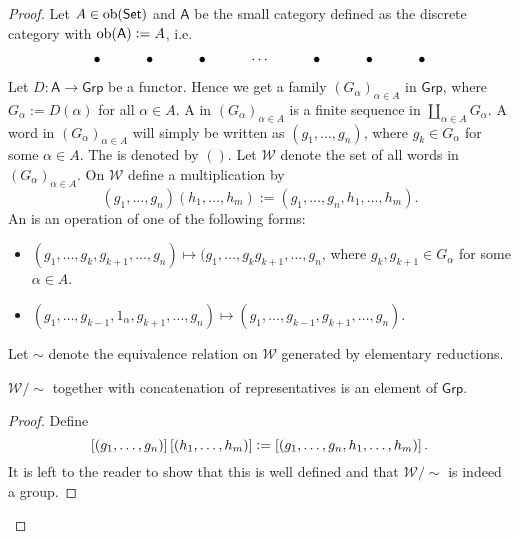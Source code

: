 \begin{proof}
	Let $A \in \operatorname{ob}(\mathsf{Set})$ and $\mathsf{A}$ be the small category defined as the discrete category with $\operatorname{ob}(\mathsf{A}) := A$, i.e.
	\begin{equation*}
		\begin{tikzcd}
			\bullet & \bullet & \bullet & \cdots & \bullet & \bullet & \bullet
		\end{tikzcd}
	\end{equation*}	
	Let $D : \mathsf{A} \to \mathsf{Grp}$ be a functor. Hence we get a family $(G_\alpha)_{\alpha \in A}$ in $\mathsf{Grp}$, where $G_\alpha := D(\alpha)$ for all $\alpha \in A$. A  in $(G_\alpha)_{\alpha \in A}$ is a finite sequence in $\coprod_{\alpha \in A}G_\alpha$. A word in $(G_\alpha)_{\alpha \in A}$ will simply be written as $(g_1,\dots, g_n)$, where $g_k \in G_\alpha$ for some $\alpha \in A$. The  is denoted by $()$. Let $\mathcal{W}$ denote the set of all words in $(G_\alpha)_{\alpha \in A}$. On $\mathcal{W}$ define a multiplication by 
	\begin{equation*}
		(g_1,\dots, g_n)(h_1,\dots, h_m) := (g_1, \dots, g_n,h_1, \dots, h_m).
	\end{equation*}
	An  is an operation of one of the following forms:
	\begin{itemize}[leftmargin = *]
		\item $(g_1, \dots ,g_k,g_{k + 1}, \dots, g_n) \mapsto (g_1,\dots,g_kg_{k + 1},\dots,g_n $, where $g_k,g_{k + 1} \in G_\alpha$ for some $\alpha \in A$.
		\item $(g_1,\dots,g_{k - 1},1_\alpha,g_{k + 1},\dots,g_n) \mapsto (g_1,\dots,g_{k - 1},g_{k + 1},\dots,g_n)$.
	\end{itemize}
	Let $\sim$ denote the equivalence relation on $\mathcal{W}$ generated by elementary reductions. 
	
	\begin{lemma}
		$\mathcal{W}/{\sim}$ together with concatenation of representatives is an element of $\mathsf{Grp}$.
		\label{lem:free_product}
	\end{lemma}

	\begin{proof}
		Define
		\begin{equation*}
			\sbr[0]{(g_1,\dots,g_n)}\sbr[0]{(h_1,\dots,h_m)} := \sbr[0]{(g_1,\dots,g_n,h_1,\dots,h_m)}.
		\end{equation*}
		It is left to the reader to show that this is well defined and that $\mathcal{W}/{\sim}$ is indeed a group.
	\end{proof}


\end{proof}
